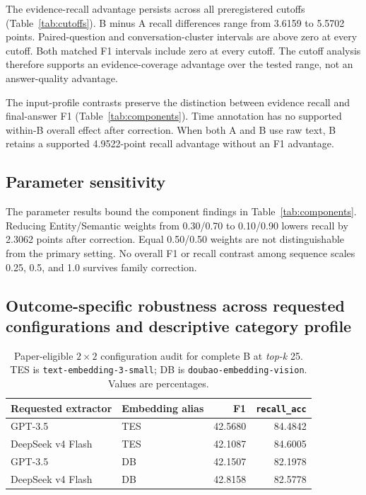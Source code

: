 \documentclass[10pt,twocolumn]{article}
\newcommand{\recallacc}{\texttt{recall\_acc}}
\newcommand{\topk}{\textit{top-k}}
\begin{document}
The evidence-recall advantage persists across all preregistered cutoffs
(Table~\ref{tab:cutoffs}). B minus A recall differences range from 3.6159 to
5.5702 points. Paired-question and conversation-cluster intervals are above
zero at every cutoff. Both matched F1 intervals include zero at every cutoff.
The cutoff analysis therefore supports an evidence-coverage advantage over the
tested range, not an answer-quality advantage.

The input-profile contrasts preserve the distinction between evidence recall
and final-answer F1 (Table~\ref{tab:components}). Time annotation has no
supported within-B overall effect after correction. When both A and B use raw
text, B retains a supported 4.9522-point recall advantage without an F1
advantage.

\subsection{Parameter sensitivity}

The parameter results bound the component findings in
Table~\ref{tab:components}. Reducing Entity/Semantic weights from 0.30/0.70 to
0.10/0.90 lowers recall by 2.3062 points after correction. Equal 0.50/0.50
weights are not distinguishable from the primary setting. No overall F1 or
recall contrast among sequence scales 0.25, 0.5, and 1.0 survives family
correction.

\subsection{Outcome-specific robustness across requested configurations and descriptive category profile}

\begin{table}[t]
\centering
\caption{Paper-eligible $2\times2$ configuration audit for complete B at
\topk{} 25. TES is
\texttt{text-embedding-3-small}; DB is
\texttt{doubao-embedding-vision}. Values are percentages.}
\label{tab:model-robustness}
\small
\begin{tabularx}{\columnwidth}{@{}Xlrr@{}}
\toprule
Requested extractor & Embedding alias & F1 & \recallacc{} \\
\midrule
GPT-3.5 & TES & 42.5680 & 84.4842 \\
DeepSeek v4 Flash & TES & 42.1087 & 84.6005 \\
GPT-3.5 & DB & 42.1507 & 82.1978 \\
DeepSeek v4 Flash & DB & 42.8158 & 82.5778 \\
\bottomrule
\end{tabularx}
\end{table}
\end{document}
